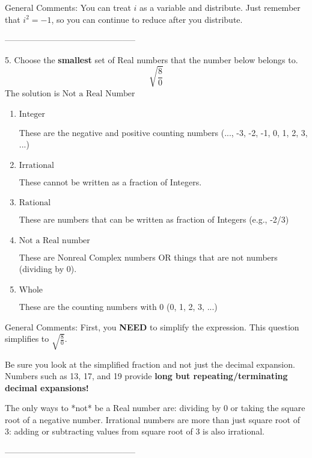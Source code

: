 \documentclass{extbook}[14pt]
\begin{document}
General Comments: You can treat $i$ as a variable and distribute. Just remember that $i^2=-1$, so you can continue to reduce after you distribute.

-----------------------------------------------

5. Choose the \textbf{smallest} set of Real numbers that the number below belongs to.
\[ \sqrt{\frac{8}{0}} \] 
The solution is $ \text{Not a Real Number} $ 

\begin{enumerate}[label=\Alph*.] 
\item $ \text{Integer} $ 

 These are the negative and positive counting numbers (..., -3, -2, -1, 0, 1, 2, 3, ...) 
\item $ \text{Irrational} $ 

 These cannot be written as a fraction of Integers. 
\item $ \text{Rational} $ 

 These are numbers that can be written as fraction of Integers (e.g., -2/3) 
\item $ \text{Not a Real number} $ 

 These are Nonreal Complex numbers OR things that are not numbers (dividing by 0). 
\item $ \text{Whole} $ 

 These are the counting numbers with 0 (0, 1, 2, 3, ...) 
\end{enumerate} 
 
General Comments: First, you \textbf{NEED} to simplify the expression. This question simplifies to $\sqrt{\frac{8}{0}}$. 
 
 Be sure you look at the simplified fraction and not just the decimal expansion. Numbers such as 13, 17, and 19 provide \textbf{long but repeating/terminating decimal expansions!} 
 
 The only ways to *not* be a Real number are: dividing by 0 or taking the square root of a negative number. Irrational numbers are more than just square root of 3: adding or subtracting values from square root of 3 is also irrational.

-----------------------------------------------
\end{document}

